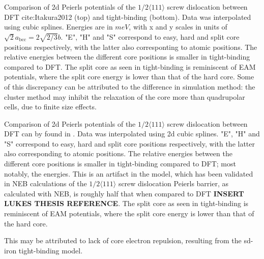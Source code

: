 \documentclass[a4paper]{article}
\begin{document}
\begin{table}
\caption{Comparison of 2d Peierls potentials of the $1/2\langle 111\rangle$ screw dislocation between DFT cite:Itakura2012 (top) and tight-binding (bottom). Data was interpolated using cubic splines. Energies are in $meV$, with x and y scales in units of $\sqrt{2} a_{\text{bcc}} = 2\sqrt{2/3}b$. "E", "H" and "S" correspond to easy, hard and split core positions respectively, with the latter also corresponting to atomic positions. The relative energies between the different core positions is smaller in tight-binding compared to DFT. The split core as seen in tight-binding is reminiscent of EAM potentials, where the split core energy is lower than that of the hard core. Some of this discrepancy can be attributed to the difference in simulation method: the cluster method may inhibit the relaxation of the core more than quadrupolar cells, due to finite size effects.}
	\label{fig:peierlspot}
    \end{table}



Comparison of 2d Peierls potentials of the \(1/2\langle 111 \rangle\) screw dislocation between
DFT can by found in \cite{Itakura2012}. Data was interpolated using 2d cubic splines. "E", "H"
and "S" correspond to easy, hard and split core positions respectively, with the latter also
corresponding to atomic positions. The relative energies between the different core
positions is smaller in tight-binding compared to DFT; most notably, the energies. This is
an artifact in the model, which has been validated in NEB calculations of the \(1/2\langle
	111\rangle\) screw dislocation Peierls barrier, as calculated with NEB, is roughly half that
when compared to DFT \textbf{INSERT LUKES THESIS REFERENCE}. The split core as seen in
tight-binding is reminiscent of EAM potentials, where the split core energy is lower than
that of the hard core.

This may be attributed to lack of core electron	repulsion, resulting from the sd-iron tight-binding model. 
\end{document}
